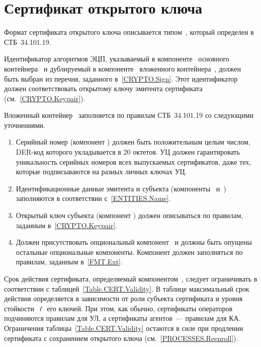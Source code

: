 \section{Сертификат открытого ключа}\label{FMT.Cert}

Формат сертификата открытого ключа описывается типом~, 
который определен в СТБ~34.101.19.

Идентификатор алгоритмов ЭЦП, указываемый в
компоненте~ основного 
контейнера~ и дублируемый в 
компоненте~ вложенного 
контейнера~, должен быть выбран из перечня, 
заданного в~\ref{CRYPTO.Sign}. Этот идентификатор должен соответствовать
открытому ключу эмитента сертификата (см.~\ref{CRYPTO.Keypair}).

Вложенный контейнер~ заполняется по правилам СТБ~34.101.19 
со следующими уточнениями.

\begin{enumerate}
\item
Серийный номер (компонент ) должен быть положительным целым
числом, DER-код которого укладывается в 20 октетов.
%
УЦ должен гарантировать уникальность серийных номеров всех выпускаемых
сертификатов, даже тех, которые подписываются на разных личных ключах УЦ.

\item
Идентификационные данные эмитента и субъекта (компоненты~ 
и~) заполняются в соответствии с~\ref{ENTITIES.Name}.

\item
Открытый ключ субъекта (компонент ) 
должен описываться по правилам, заданным в~\ref{CRYPTO.Keypair}. 

\item
Должен присутствовать опциональный компонент~ и должны быть
опущены остальные опциональные компоненты. Компонент  должен
заполняться по правилам, заданным в~\ref{FMT.Ext}.
\end{enumerate}

Срок действия сертификата, определяемый компонентом~,
следует ограничивать в соответствии с таблицей~\ref{Table.CERT.Validity}.
%
В таблице максимальный срок действия определяется в зависимости от роли 
субъекта сертификата и уровня стойкости~$\ell$ его ключей.
%
При этом, как обычно, сертификаты операторов подчиняются правилам для УЛ, а 
сертификаты агентов~--- правилам для КА.
%
Ограничения таблицы~\ref{Table.CERT.Validity} остаются в силе при продлении 
сертификата с сохранением открытого ключа (см.~\ref{PROCESSES.Reenroll}).

